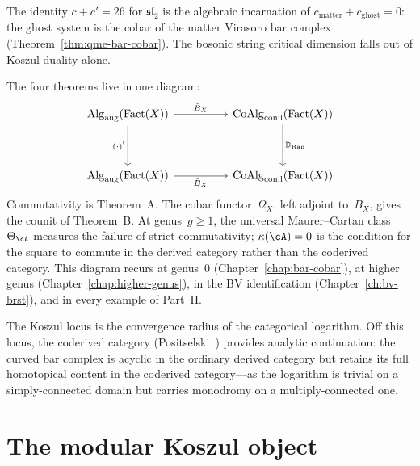 \begin{remark}\label{rem:bosonic-string-26}
The identity $c + c' = 26$ for $\mathfrak{sl}_2$ is the algebraic
incarnation of $c_{\mathrm{matter}} + c_{\mathrm{ghost}} = 0$:
the ghost system is the cobar of the matter Virasoro bar complex
(Theorem~\ref{thm:qme-bar-cobar}).  The bosonic string critical
dimension falls out of Koszul duality alone.
\end{remark}

\medskip

The four theorems live in one diagram:
\begin{equation}\label{eq:master-square}
\begin{tikzcd}[row sep=huge, column sep=huge]
\operatorname{Alg}_{\mathrm{aug}}(\operatorname{Fact}(X))
  \arrow[r, "\bar{B}_X"]
  \arrow[d, "(\cdot)^!"']
& \operatorname{CoAlg}_{\mathrm{conil}}(\operatorname{Fact}(X))
  \arrow[d, "\mathbb{D}_{\operatorname{Ran}}"]
\\
\operatorname{Alg}_{\mathrm{aug}}(\operatorname{Fact}(X))
  \arrow[r, "\bar{B}_X"']
& \operatorname{CoAlg}_{\mathrm{conil}}(\operatorname{Fact}(X))
\end{tikzcd}
\end{equation}
Commutativity is Theorem~A\@.  The cobar functor~$\Omega_X$, left
adjoint to~$\bar{B}_X$, gives the counit of Theorem~B\@.  At
genus~$g \geq 1$, the universal Maurer--Cartan class~$\Theta_\cA$
measures the failure of strict commutativity; $\kappa(\cA) = 0$ is
the condition for the square to commute in the derived category
rather than the coderived category.  This diagram recurs at
genus~$0$ (Chapter~\ref{chap:bar-cobar}), at higher genus
(Chapter~\ref{chap:higher-genus}), in the BV identification
(Chapter~\ref{ch:bv-brst}), and in every example of
Part~\textup{II}.

The Koszul locus is the convergence radius of the categorical
logarithm.  Off this locus, the coderived category
(Positselski~\cite{Positselski11}) provides analytic continuation:
the curved bar complex is acyclic in the ordinary derived category
but retains its full homotopical content in the coderived
category---as the logarithm is trivial on a simply-connected domain
but carries monodromy on a multiply-connected one.

\section{The modular Koszul object}

